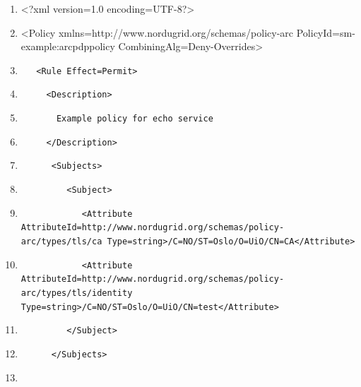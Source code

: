 \documentclass{article}
\newcommand\liststyleWWviiiNumxiv{%
\renewcommand\theenumi{\arabic{enumi}}
\renewcommand\theenumii{\arabic{enumii}}
\renewcommand\theenumiii{\arabic{enumiii}}
\renewcommand\theenumiv{\arabic{enumiv}}
\renewcommand\labelenumi{\theenumi.}
\renewcommand\labelenumii{\theenumii.}
\renewcommand\labelenumiii{\theenumiii.}
\renewcommand\labelenumiv{\theenumiv.}
}
\begin{document}
\liststyleWWviiiNumxiv
\begin{enumerate}
\item {\ttfamily\color{black}
{\textless}?xml version={\textquotedbl}1.0{\textquotedbl}
encoding={\textquotedbl}UTF-8{\textquotedbl}?{\textgreater}}
\item {\ttfamily\color{black}
{\textless}Policy
xmlns={\textquotedbl}http://www.nordugrid.org/schemas/policy-arc{\textquotedbl}
PolicyId={\textquotedbl}sm-example:arcpdppolicy{\textquotedbl}
CombiningAlg={\textquotedbl}Deny-Overrides{\textquotedbl}{\textgreater}}
\item {\color{black}
\texttt{\ \ \ {\textless}Rule
Effect={\textquotedbl}Permit{\textquotedbl}{\textgreater}}}
\item {\color{black}
\texttt{\ \ \ \ \ {\textless}Description{\textgreater}}}
\item {\color{black}
\texttt{\ \ \ \ \ \ \ Example policy for echo service}}
\item {\color{black}
\texttt{\ \ \ \ \ {\textless}/Description{\textgreater}}}
\item {\color{black}
\texttt{\ \ \ \ \ \ {\textless}Subjects{\textgreater}}}
\item {\color{black}
\texttt{\ \ \ \ \ \ \ \ \ {\textless}Subject{\textgreater}}}
\item {\color{black}
\texttt{\ \ \ \ \ \ \ \ \ \ \ \ {\textless}Attribute
AttributeId={\textquotedbl}http://www.nordugrid.org/schemas/policy-arc/types/tls/ca{\textquotedbl}
Type={\textquotedbl}string{\textquotedbl}{\textgreater}/C=NO/ST=Oslo/O=UiO/CN=CA{\textless}/Attribute{\textgreater}}}
\item {\color{black}
\texttt{\ \ \ \ \ \ \ \ \ \ \ \ {\textless}Attribute
AttributeId={\textquotedbl}http://www.nordugrid.org/schemas/policy-arc/types/tls/identity{\textquotedbl}
Type={\textquotedbl}string{\textquotedbl}{\textgreater}/C=NO/ST=Oslo/O=UiO/CN=test{\textless}/Attribute{\textgreater}}}
\item {\color{black}
\texttt{\ \ \ \ \ \ \ \ \ {\textless}/Subject{\textgreater}}}
\item {\color{black}
\texttt{\ \ \ \ \ \ {\textless}/Subjects{\textgreater}}}
\item {\color{black}
}
\end{enumerate}
\end{document}
